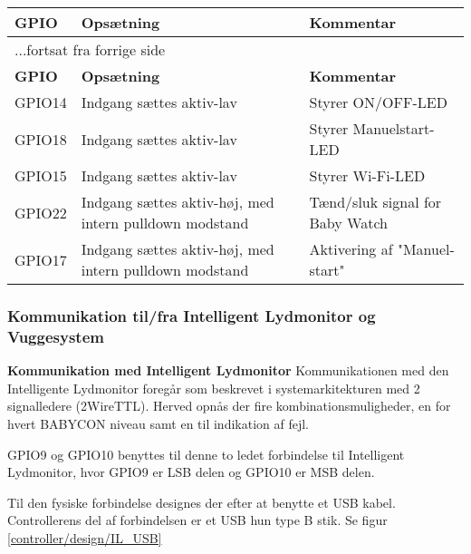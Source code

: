 \begin{center}
\label{ctrl:raspberry_pi_setup}
\begin{longtable}{|p{3cm}|p{4cm}|p{4cm}|}
\hline
\textbf{GPIO}	&\textbf{Opsætning} 		&\textbf{Kommentar} 	\\ \hline
\endfirsthead
\multicolumn{3}{l}{...fortsat fra forrige side} \\ \hline 
\textbf{GPIO}	&\textbf{Opsætning} 		&\textbf{Kommentar}  \\ \hline
\endhead



GPIO14
&Indgang sættes aktiv-lav
&Styrer ON/OFF-LED

\\\hline

GPIO18
&Indgang sættes aktiv-lav
&Styrer Manuelstart-LED

\\\hline


GPIO15
&Indgang sættes aktiv-lav
&Styrer Wi-Fi-LED

\\\hline

GPIO22
&Indgang sættes aktiv-høj, med intern pulldown modstand
&Tænd/sluk signal for Baby Watch

\\\hline

GPIO17
&Indgang sættes aktiv-høj, med intern pulldown modstand
&Aktivering af "Manuel-start"
\\\hline

\end{longtable}
\end{center}

\subsubsection*{Kommunikation til/fra Intelligent Lydmonitor og Vuggesystem}

\textbf{Kommunikation med Intelligent Lydmonitor}
Kommunikationen med den Intelligente Lydmonitor foregår som beskrevet i systemarkitekturen med 2 signalledere (2WireTTL). Herved opnås der fire kombinationsmuligheder, en for hvert BABYCON niveau samt en til indikation  af fejl.

GPIO9 og GPIO10 benyttes til denne to ledet forbindelse til Intelligent Lydmonitor, hvor GPIO9 er LSB delen og GPIO10 er MSB delen. 

Til den fysiske forbindelse designes der efter at benytte et USB kabel. Controllerens del af forbindelsen er et USB hun type B stik. Se figur \ref{controller/design/IL_USB}

